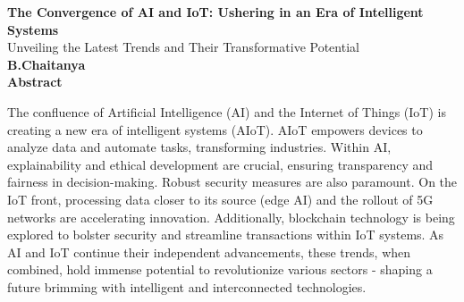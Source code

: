 \documentclass[10pt,a4paper]{article}
\begin{document}
\thispagestyle{plain}
\begin{center}
	\textbf{\Large The Convergence of AI and IoT: Ushering in an Era of Intelligent Systems}\\
	\vspace{0.4cm}
	\large
	Unveiling the Latest Trends and Their Transformative Potential\\
	\vspace{0.4cm}
	\textbf{B.Chaitanya}\\
	\vspace{0.9cm}
	\textbf{Abstract}
\end{center}
The confluence of Artificial Intelligence (AI) and the Internet of Things (IoT) is creating a new era of intelligent systems (AIoT).
AIoT empowers devices to analyze data and automate tasks, transforming industries. Within AI, explainability and ethical development are crucial, ensuring transparency and fairness in decision-making. Robust security measures are also paramount. On the IoT front, processing data closer to its source (edge AI) and the rollout of 5G networks are accelerating innovation. Additionally, blockchain technology is being explored to bolster security and streamline transactions within IoT systems. As AI and IoT continue their independent advancements, these trends, when combined, hold immense potential to revolutionize various sectors - shaping a future brimming with intelligent and interconnected technologies.
\end{document}
